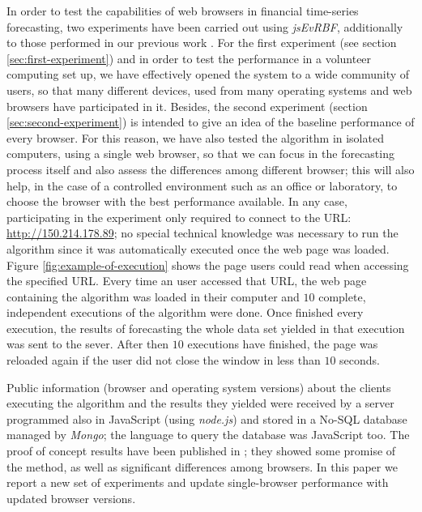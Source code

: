 \documentclass{article}
\begin{document}
In order to test the capabilities of web browsers in financial time-series forecasting,
two experiments have been carried out using {\em jsEvRBF},
additionally to those performed in our previous work
\cite{DBLP:conf/dcai/RivasPMAG16}.
For the first experiment (see section \ref{sec:first-experiment}) and in order to test the performance in a volunteer computing set up, we
have effectively opened the system to a wide community of users, so that many different
devices, used from many operating systems and web browsers have
participated in it. Besides, the second experiment (section \ref{sec:second-experiment}) is intended to give an idea of the
baseline performance of every browser. For this reason, we have
also tested the algorithm in isolated computers, using a single web
browser, so that we can focus in the forecasting process itself and
also assess the differences among different browser; this will also
help, in the case of a controlled environment such as an office or
laboratory, to choose the browser with the best performance
available.
In any case, participating in the experiment only required to connect
to the URL: \url{http://150.214.178.89}; no special technical knowledge was necessary to run the
algorithm since it was automatically executed once the web page was
loaded. Figure \ref{fig:example-of-execution} shows the page users
could read when accessing the specified URL.
Every time an user accessed that URL, the web page containing the algorithm was loaded in their computer and $10$ complete, independent executions of the algorithm were done. Once finished every execution, the results of forecasting the whole data set yielded in that execution was sent to the sever. After then $10$ executions have finished, the page was reloaded again if the user did not close the window in less than $10$ seconds.


Public information (browser and operating system versions) about the clients executing the algorithm and the results they yielded were received
by a server programmed also in JavaScript (using {\em node.js}) and
stored in a No-SQL database managed by {\em Mongo}; the language to
query the database was JavaScript too. The proof of concept results
have been published in \cite{DBLP:conf/dcai/2016de}; they showed some
promise of the method, as well as significant differences among
browsers. In this paper we report a new set of experiments and update
single-browser performance with updated browser versions.
\end{document}
